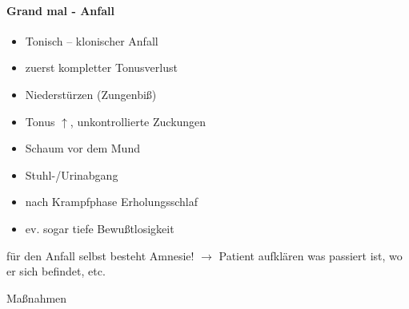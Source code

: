 \documentclass{article}
\begin{document}
\paragraph{Grand mal - Anfall}
\begin{itemize}
\item Tonisch -- klonischer Anfall

\item zuerst kompletter Tonusverlust

\item Niederst\"urzen (Zungenbi{\ss})

\item Tonus ${\uparrow}$, unkontrollierte Zuckungen

\item Schaum vor dem Mund

\item Stuhl-/Urinabgang

\item nach Krampfphase Erholungsschlaf

\item ev. sogar tiefe Bewu{\ss}tlosigkeit

\end{itemize}
f\"ur den Anfall selbst besteht Amnesie! ${\rightarrow}$ Patient
aufkl\"aren was passiert ist, wo er sich befindet, etc.

Ma{\ss}nahmen
\end{document}
